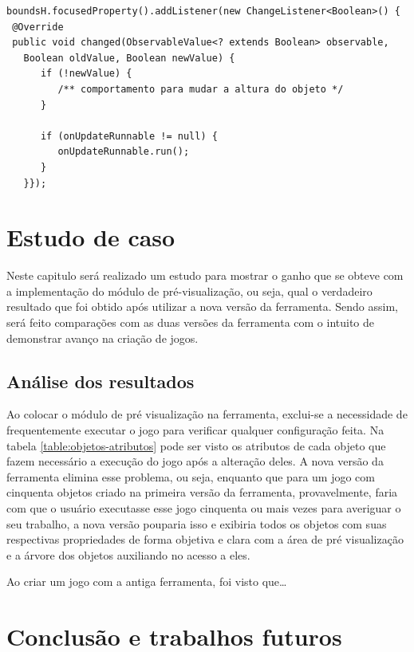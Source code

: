 \documentclass[12pt,twoside,openright,a4paper,english,brazil,sumario=tradicional]{abntex2}
\begin{document}
\begin{mylisting}[h]
\begin{lstlisting}
boundsH.focusedProperty().addListener(new ChangeListener<Boolean>() {
 @Override
 public void changed(ObservableValue<? extends Boolean> observable,
   Boolean oldValue, Boolean newValue) {
      if (!newValue) {
         /** comportamento para mudar a altura do objeto */
      }

      if (onUpdateRunnable != null) {
         onUpdateRunnable.run();
      }
   }});
\end{lstlisting}
\end{mylisting}


\chapter{Estudo de caso}
\label{chap:caso}

Neste capitulo será realizado um estudo para mostrar o ganho que se obteve com a implementação do módulo de pré-visualização, ou seja, qual o verdadeiro resultado que foi obtido após utilizar a nova versão da ferramenta. Sendo assim, será feito comparações com as duas versões da ferramenta com o intuito de demonstrar avanço na criação de jogos.

\section{Análise dos resultados}

Ao colocar o módulo de pré visualização na ferramenta, exclui-se a necessidade de frequentemente executar o jogo para verificar qualquer configuração feita. Na tabela \ref{table:objetos-atributos} pode ser visto os atributos de cada objeto que fazem necessário a execução do jogo após a alteração deles. A nova versão da ferramenta elimina esse problema, ou seja, enquanto que para um jogo com cinquenta objetos criado na primeira versão da ferramenta, provavelmente, faria com que o usuário executasse esse jogo cinquenta ou mais vezes para averiguar o seu trabalho, a nova versão pouparia isso e exibiria todos os objetos com suas respectivas propriedades de forma objetiva e clara com a área de pré visualização e a árvore dos objetos auxiliando no acesso a eles.

Ao criar um jogo com a antiga ferramenta, foi visto que\ldots


\chapter{Conclusão e trabalhos futuros}
\label{chap:conclcsao}
\end{document}
